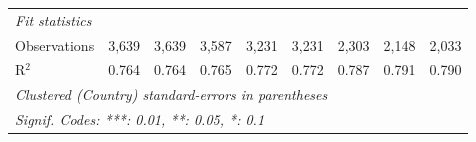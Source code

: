 \begin{tabular}{lcccccccc}
   \midrule \emph{Fit statistics}\\
   Observations                                                                 & 3,639   & 3,639   & 3,587   & 3,231       & 3,231       & 2,303         & 2,148         & 2,033\\  
   R$^2$                                                                        & 0.764   & 0.764   & 0.765   & 0.772       & 0.772       & 0.787         & 0.791         & 0.790\\  
   \midrule
   \multicolumn{9}{l}{\emph{Clustered (Country) standard-errors in parentheses}}\\
   \multicolumn{9}{l}{\emph{Signif. Codes: ***: 0.01, **: 0.05, *: 0.1}}\\
\end{tabular}
\par\endgroup


